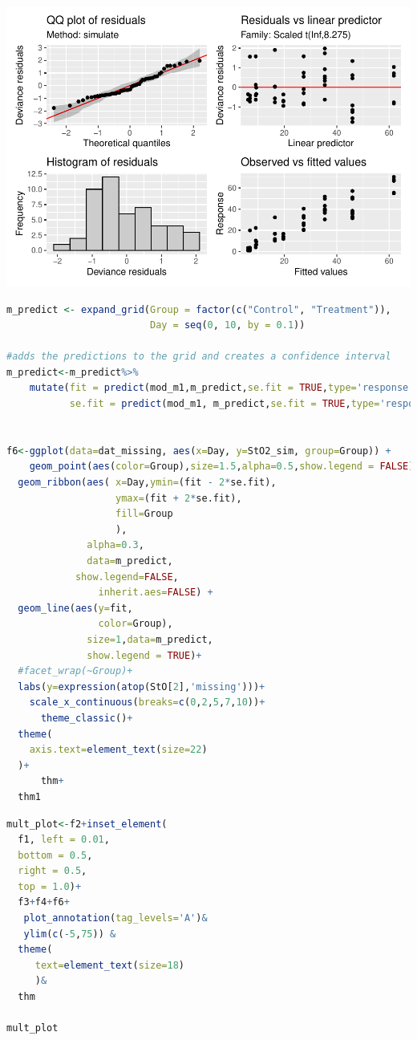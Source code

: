 \documentclass[
]{article}
\begin{document}
\includegraphics{Full_document_files/figure-latex/missing-data-Appendix-1}

\begin{lstlisting}[language=R]
m_predict <- expand_grid(Group = factor(c("Control", "Treatment")),
                         Day = seq(0, 10, by = 0.1))

#adds the predictions to the grid and creates a confidence interval
m_predict<-m_predict%>%
    mutate(fit = predict(mod_m1,m_predict,se.fit = TRUE,type='response')$fit,
           se.fit = predict(mod_m1, m_predict,se.fit = TRUE,type='response')$se.fit)


f6<-ggplot(data=dat_missing, aes(x=Day, y=StO2_sim, group=Group)) +
    geom_point(aes(color=Group),size=1.5,alpha=0.5,show.legend = FALSE)+
  geom_ribbon(aes( x=Day,ymin=(fit - 2*se.fit), 
                   ymax=(fit + 2*se.fit),
                   fill=Group
                   ),
              alpha=0.3,
              data=m_predict,
            show.legend=FALSE,
                inherit.aes=FALSE) +
  geom_line(aes(y=fit,
                color=Group),
              size=1,data=m_predict,
              show.legend = TRUE)+
  #facet_wrap(~Group)+
  labs(y=expression(atop(StO[2],'missing')))+
    scale_x_continuous(breaks=c(0,2,5,7,10))+
      theme_classic()+
  theme(
    axis.text=element_text(size=22)
  )+
      thm+
  thm1
\end{lstlisting}



\begin{lstlisting}[language=R]
mult_plot<-f2+inset_element(
  f1, left = 0.01, 
  bottom = 0.5, 
  right = 0.5, 
  top = 1.0)+
  f3+f4+f6+
   plot_annotation(tag_levels='A')&
   ylim(c(-5,75)) &
  theme(
     text=element_text(size=18)
     )&
  thm

mult_plot
\end{lstlisting}
\end{document}
